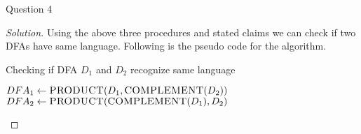 \begin{solution}{Question 4}
\begin{proof}[Solution]
        Using the above three procedures and stated claims we can check if two DFAs have same language. Following is the pseudo code for the algorithm.
        
        \begin{algorithm}[H]
            \caption{Checking if DFA $D_1$ and $D_2$ recognize same language}
            \begin{algorithmic}[1]
                    \State $DFA_1 \gets \textsc{PRODUCT}(D_1, \textsc{COMPLEMENT}(D_2))$
                    \State $DFA_2 \gets \textsc{PRODUCT}(\textsc{COMPLEMENT}(D_1), D_2)$
                    \State 
                    \EndIf{}
                \EndProcedure{}
            \end{algorithmic}
        \end{algorithm}
        
    \end{proof}
\end{solution}
